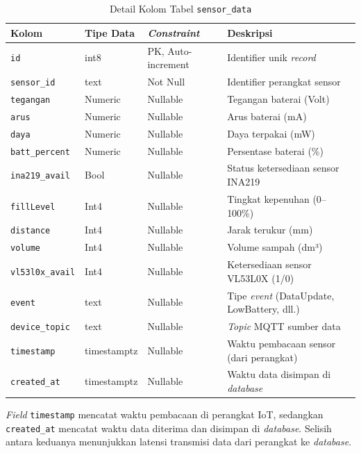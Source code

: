 \begin{table}[H]
  \caption{Detail Kolom Tabel \texttt{sensor\_data}}
  \label{tab:impl-detail-sensordata}
  \begin{tabularx}{\textwidth}{| l | l | l | X |}
    \hline
    \textbf{Kolom} & \textbf{Tipe Data} & \textbf{\textit{Constraint}} & \textbf{Deskripsi} \\
    \hline
    \texttt{id} & int8 & PK, Auto-increment & Identifier unik \textit{record} \\
    \hline
    \texttt{sensor\_id} & text & Not Null & Identifier perangkat sensor \\
    \hline
    \texttt{tegangan} & Numeric & Nullable & Tegangan baterai (Volt) \\
    \hline
    \texttt{arus} & Numeric & Nullable & Arus baterai (mA) \\
    \hline
    \texttt{daya} & Numeric & Nullable & Daya terpakai (mW) \\
    \hline
    \texttt{batt\_percent} & Numeric & Nullable & Persentase baterai (\%) \\
    \hline
    \texttt{ina219\_avail} & Bool & Nullable & Status ketersediaan sensor INA219 \\
    \hline
    \texttt{fillLevel} & Int4 & Nullable & Tingkat kepenuhan (0--100\%) \\
    \hline
    \texttt{distance} & Int4 & Nullable & Jarak terukur (mm) \\
    \hline
    \texttt{volume} & Int4 & Nullable & Volume sampah (dm³) \\
    \hline
    \texttt{vl53l0x\_avail} & Int4 & Nullable & Ketersediaan sensor VL53L0X (1/0) \\
    \hline
    \texttt{event} & text & Nullable & Tipe \textit{event} (DataUpdate, LowBattery, dll.) \\
    \hline
    \texttt{device\_topic} & text & Nullable & \textit{Topic} MQTT sumber data \\
    \hline
    \texttt{timestamp} & timestamptz & Nullable & Waktu pembacaan sensor (dari perangkat) \\
    \hline
    \texttt{created\_at} & timestamptz & Nullable & Waktu data disimpan di \textit{database} \\
    \hline
  \end{tabularx}
\end{table}

\textit{Field} \texttt{timestamp} mencatat waktu pembacaan di perangkat IoT, sedangkan \texttt{created\_at} mencatat waktu data diterima dan disimpan di \textit{database}. Selisih antara keduanya menunjukkan latensi transmisi data dari perangkat ke \textit{database}.

